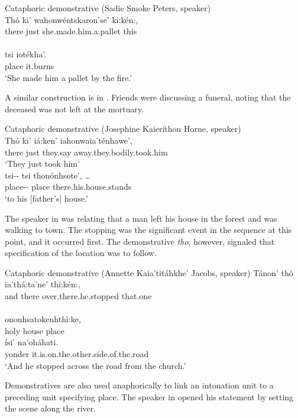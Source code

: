 \documentclass[output=paper,colorlinks,citecolor=brown]{langscibook}
\begin{document}
\ea \label{ex:mithun:8} Cataphoric demonstrative (Sadie Smoke Peters, speaker)\\
\gll Thó    ki' wahonwéntskaron'se'      ki:kén:,\\
     there  just  {she.made.him.a.pallet}  this  \\
\medskip\\
\gll tsi iotékha'.\\
place {it.burns}\\
\glt `She made him a pallet by the fire.'
\z

A similar construction is in . Friends were discussing a funeral, noting that the deceased was not left at the mortuary.

\ea\label{ex:mithun:9}Cataphoric demonstrative (Josephine Kaieríthon Horne, speaker)\\
\gll Thó ki' iá:ken' iahonwaia'ténhawe',\\
there {just} {they.say} {away.they.bodily.took.him}\\
\glt `They just took him'\medskip\\
\gll tsi-\/- tsi {thonónhsote',  \ldots }\\
     place-\/-  place {there.his.house.stands}\\
\glt `to his {[}father's{]} house.'
\z

The speaker in  was relating that a man left his house in the forest and was walking to town. The stopping was the significant event in the sequence at this point, and it occurred first. The demonstrative \emph{tho}, however, signaled that specification of the location was to follow.


\ea \label{ex:mithun:10}Cataphoric demonstrative (Annette Kaia'titáhkhe' Jacobs, speaker)
\gll Tánon' thó ia'thá:ta'ne'             thi:kén:,\\
     and  there  {over.there.he.stopped}  {that.one}\\
\medskip\\
ononhsatokenhthì:ke,\\
holy house place\medskip\\
\gll ísi' na'oháhati.\\
yonder {it.is.on.the.other.side.of.the.road}\\
\glt `And he stopped across the road from the church.'
\z

Demonstratives are also used anaphorically to link an intonation unit to a preceding unit specifying place. The speaker in  opened his statement by setting the scene along the river.
\end{document}
